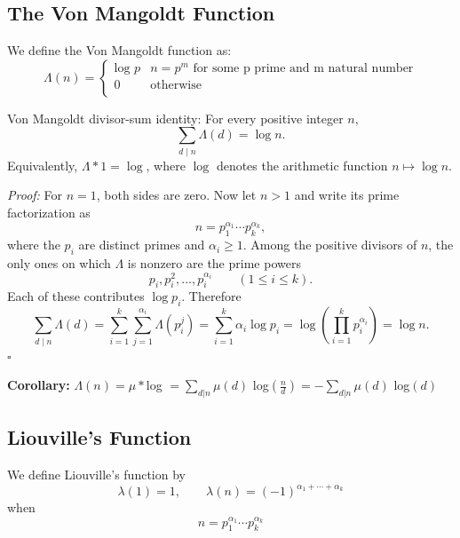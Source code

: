 \documentclass[a4paper,11pt,abstracton]{scrartcl}
\theoremstyle{dotlessP}
\theoremstyle{dotlessS}
\theoremstyle{remark}
\theoremstyle{definition}
\begin{document}
\subsection{The Von Mangoldt Function}
\begin{definition_box}
We define the Von Mangoldt function as:
\begin{equation*}
\Lambda(n)=
    \begin{cases}
        \text{log }p &  n=p^m \text{ for some p prime and m natural number}\\
        0 & \text{otherwise}\\
    \end{cases}
\end{equation*}
\end{definition_box}

\begin{mainbox}{Von Mangoldt divisor-sum identity:}
For every positive integer $n$,
\[
    \sum_{d\mid n}\Lambda(d)=\log n.
\]
Equivalently, $\Lambda*1=\log$, where $\log$ denotes the arithmetic
function $n\mapsto\log n$.
\end{mainbox}

\begin{claim_box}
\textit{Proof:}
For $n=1$, both sides are zero. Now let $n>1$ and write its prime
factorization as
\[
    n=p_1^{\alpha_1}\cdots p_k^{\alpha_k},
\]
where the $p_i$ are distinct primes and $\alpha_i\geq1$.
Among the positive divisors of $n$, the only ones on which $\Lambda$
is nonzero are the prime powers
\[
    p_i,p_i^2,\ldots,p_i^{\alpha_i}
    \qquad(1\leq i\leq k).
\]
Each of these contributes $\log p_i$. Therefore
\[
    \sum_{d\mid n}\Lambda(d)
      =\sum_{i=1}^{k}\sum_{j=1}^{\alpha_i}\Lambda(p_i^j)
      =\sum_{i=1}^{k}\alpha_i\log p_i
      =\log\!\left(\prod_{i=1}^{k}p_i^{\alpha_i}\right)
      =\log n.
\]
\hfill$\square$
\end{claim_box}

\textbf{Corollary:} 
$\Lambda(n) = \mu * $log $ = \sum_{d|n}\mu(d)$ log$(\frac{n}{d}) = -\sum_{d|n}\mu(d)$ log$(d)$

\subsection{Liouville's Function}

\begin{definition_box}
We define Liouville's function by
\[
    \lambda(1)=1,
    \qquad
    \lambda(n)=(-1)^{\alpha_1+\cdots+\alpha_k}
\]
when
\[
    n=p_1^{\alpha_1}\cdots p_k^{\alpha_k}
\]
\end{definition_box}
\end{document}

